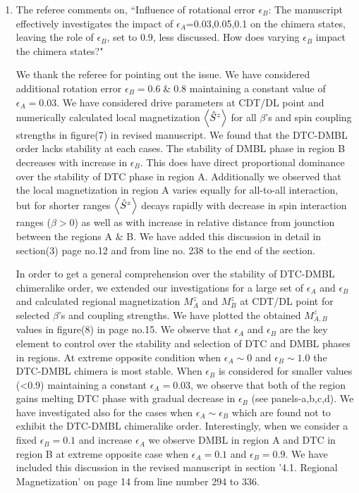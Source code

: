 \documentclass[aps,prb,reprint,showpacs,floatfix,superscriptaddress, onecolumn, nofootinbib, 10pt]{revtex4-2}
\newcommand{\response}[1]{{\color{black}#1}} %
\newcommand{\comment}[1]{{\color{blue}#1}} %
\begin{document}
\begin{enumerate}
\begin{enumerate}
		\item The referee comments on, \comment{``Influence of rotational error $\epsilon_B$: The manuscript effectively investigates the
			impact of $\epsilon_A$={0.03,0.05,0.1} on the chimera states, leaving the role of $\epsilon_B$, set to 0.9, less discussed. How does varying $\epsilon_B$ impact the chimera
			states?"}\\
		
		\response{We thank the referee for pointing out the issue. We have considered additional rotation error $\epsilon_B = 0.6\; \&\; 0.8$ maintaining a constant value of $\epsilon_A = 0.03$. We have considered drive parameters at CDT/DL point and numerically calculated local magnetization $\expval{\hat{S}^z}$ for all $\beta$'s and spin coupling strengths in figure(7) in revised manuscript. We found that the DTC-DMBL order lacks stability at each cases. The stability of DMBL phase in region B decreases with increase in $\epsilon_B$. This does have direct proportional dominance over the stability of DTC phase in region A. Additionally we observed that the local magnetization in region A varies equally for all-to-all interaction, but for shorter ranges $\expval{\hat{S}^z}$ decays rapidly with decrease in spin interaction ranges ($\beta >0$) as well as with increase in relative distance from jounction between the regions A $\&$ B. We have added this discussion in detail in section(3) page no.12 and from line no. 238 to the end of the section.
			
		In order to get a general comprehension over the stability of DTC-DMBL chimeralike order, we extended our investigations for a large set of $\epsilon_A$ and $\epsilon_B$ and calculated regional magnetization $M^z_A$ and $M^z_B$ at CDT/DL point for selected $\beta$'s and coupling strengths. We have plotted the obtained $M^z_{A,B}$ values in figure(8) in page no.15. We observe that $\epsilon_A$ and $\epsilon_B$ are the key element to control over the stability and selection of DTC and DMBL phases in regions. At extreme opposite condition when $\epsilon_A \sim 0$ and $\epsilon_B\sim1.0$ the DTC-DMBL chimera is most stable. When $\epsilon_B$ is considered for smaller values (<0.9) maintaining a constant $\epsilon_A = 0.03$, we observe that both of the region gains melting DTC phase with gradual decrease in $\epsilon_B$ (see panels-a,b,c,d). We have investigated also for the cases when $\epsilon_A\sim\epsilon_B$ which are found not to exhibit the DTC-DMBL chimeralike order. Interestingly, when we consider a fixed $\epsilon_B=0.1$ and increase $\epsilon_A$ we observe DMBL in region A and DTC in region B at extreme opposite case when $\epsilon_A=0.1$ and $\epsilon_B=0.9$. We have included this discussion in the revised manuscript in section '4.1. Regional Magnetization' on page 14 from line number 294 to 336.
		
}
\end{enumerate}
\end{enumerate}
\end{document}
